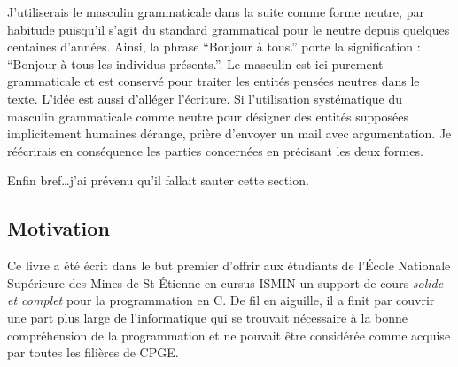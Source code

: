 \documentclass[../main.tex]{subfiles}
\begin{document}
J'utiliserais le masculin grammaticale dans la suite comme forme neutre, par habitude puisqu'il s'agit du standard grammatical pour le neutre depuis quelques centaines d'années. Ainsi, la phrase ``Bonjour à tous.'' porte la signification : ``Bonjour à tous les individus présents.''. Le masculin est ici purement grammaticale et est conservé pour traiter les entités pensées neutres dans le texte. L'idée est aussi d'alléger l'écriture. Si l'utilisation systématique du masculin grammaticale comme neutre pour désigner des entités supposées implicitement humaines dérange, prière d'envoyer un mail avec argumentation. Je réécrirais en conséquence les parties concernées en précisant les deux formes.

Enfin bref\dots j'ai prévenu qu'il fallait sauter cette section.
\subsection*{Motivation}
Ce livre a été écrit dans le but premier d'offrir aux étudiants de l'École Nationale Supérieure des
Mines de St-Étienne en cursus ISMIN un support de cours \textit{solide et complet} pour la programmation en C. De fil
en aiguille, il a finit par couvrir une part plus large de l'informatique qui se trouvait nécessaire à la
bonne compréhension de la programmation et ne pouvait être considérée comme acquise par toutes les
filières de CPGE.
\end{document}

